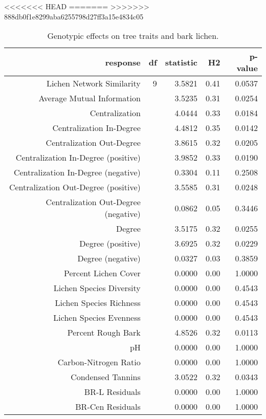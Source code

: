 <<<<<<< HEAD
=======
>>>>>>> 888db0f1e8299aba6255798d27ff3a15e4834c05
\begin{table}[ht]
\centering
\begin{tabular}{rrrrr}
  \hline
response & df & statistic & H2 & p-value \\ 
  \hline
Lichen Network Similarity & 9 & 3.5821 & 0.41 & 0.0537 \\ 
  Average Mutual Information &  & 3.5235 & 0.31 & 0.0254 \\ 
  Centralization &  & 4.0444 & 0.33 & 0.0184 \\ 
  Centralization In-Degree &  & 4.4812 & 0.35 & 0.0142 \\ 
  Centralization Out-Degree &  & 3.8615 & 0.32 & 0.0205 \\ 
  Centralization In-Degree (positive) &  & 3.9852 & 0.33 & 0.0190 \\ 
  Centralization In-Degree (negative) &  & 0.3304 & 0.11 & 0.2508 \\ 
  Centralization Out-Degree (positive) &  & 3.5585 & 0.31 & 0.0248 \\ 
  Centralization Out-Degree (negative) &  & 0.0862 & 0.05 & 0.3446 \\ 
  Degree &  & 3.5175 & 0.32 & 0.0255 \\ 
  Degree (positive) &  & 3.6925 & 0.32 & 0.0229 \\ 
  Degree (negative) &  & 0.0327 & 0.03 & 0.3859 \\ 
  Percent Lichen Cover &  & 0.0000 & 0.00 & 1.0000 \\ 
  Lichen Species Diversity &  & 0.0000 & 0.00 & 0.4543 \\ 
  Lichen Species Richness &  & 0.0000 & 0.00 & 0.4543 \\ 
  Lichen Species Evenness &  & 0.0000 & 0.00 & 0.4543 \\ 
  Percent Rough Bark &  & 4.8526 & 0.32 & 0.0113 \\ 
  pH &  & 0.0000 & 0.00 & 1.0000 \\ 
  Carbon-Nitrogen Ratio &  & 0.0000 & 0.00 & 1.0000 \\ 
  Condensed Tannins &  & 3.0522 & 0.32 & 0.0343 \\ 
  BR-L Residuals &  & 0.0000 & 0.00 & 1.0000 \\ 
  BR-Cen Residuals &  & 0.0000 & 0.00 & 1.0000 \\ 
   \hline
\end{tabular}
\caption{Genotypic effects on tree traits and bark lichen.} 
\label{tab:h2_table}
\end{table}

